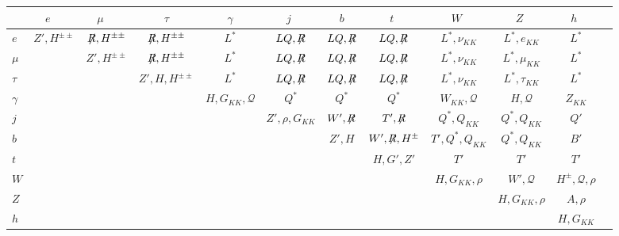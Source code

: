 \begin{table}

\begin{adjustbox}{width=1\textwidth}
\begin{tabular}{lccccccccccc}

\hline
\hline
 & $e$\ \   & $\mu$\ \   & \ \  $\tau$\ \   & \ \  $\gamma$\ \   & \ \  $j$ \ \   & \ \  $b$\ \  & \ \ $t$ \ \ & \ \ $W$ \ \ & \ \ $Z$ \ \ & \ \ $h$ \ \   \\
\hline
$e$ &  $Z',H^{\pm\pm} $ & $\not \! \! R,H^{\pm\pm} $ & $\not \! \! R,H^{\pm\pm} $ & $L^*$  & $LQ,\not \!\! R$ & $LQ, \not \!\! R$ & $LQ,\not \!\! R$ & $L^*, \nu_{KK}$ & $L^*, e_{KK}$ & $L^*$ \\
$ \mu $ &  & $Z',H^{\pm\pm}$ & $\not \! \! R,H^{\pm\pm} $ & $L^*$  & $LQ,\not \!\! R$ & $LQ, \not \!\! R$ & $LQ,\not \!\! R$ & $L^*, \nu_{KK}$ & $L^*, \mu_{KK}$ & $L^*$ \\
$\tau$ &  &  & $Z',H,H^{\pm\pm}$ & $L^*$ & $LQ, \not \!\! R$ & $LQ,\not \!\! R$ & $LQ,\not \!\! R$ & $L^*, \nu_{KK}$ & $L^*, \tau_{KK}$ & $L^*$ \\
$\gamma$ &  & & & $H, G_{KK}, \mathcal{Q}$ & $Q^*$ & $Q^*$ & $Q^*$ & $W_{KK}, \mathcal{Q}$ & $H, \mathcal{Q}$ & $Z_{KK}$\\
$j$ &  &  &  &  & $Z',\rho, G_{KK}$ & $W',\not \!\! R$ & $T', \not \!\! R$ & $Q^*, Q_{KK}$  & $Q^*, Q_{KK}$  & $Q'$\\
$b$  &  &  &  &  &  & $Z',H$ & $W', \not \!\! R, H^\pm$ &  $T',Q^*, Q_{KK}$  & $Q^*, Q_{KK}$  & $B'$\\
$t$ &  &  &  &  &  &   & $H,G',Z'$ & $T'$ & $T'$  & $T'$\\
$W$ &  &  &  &  &  &  &  & $H, G_{KK}, \rho$ & $W', \mathcal{Q}$ & $H^\pm, \mathcal{Q}, \rho$ \\
$Z$ &  &  &  &  &  &  &  &  & $H, G_{KK}, \rho$ & $A, \rho$   \\
$h$ &  &  &  &  &  &  &  &  &  & $H, G_{KK}$ \\

\hline
\hline
\end{tabular}
\label{tab:restheory}
\end{adjustbox}
\end{table}



